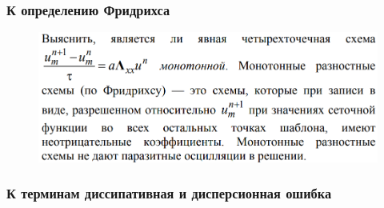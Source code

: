 \documentclass[a4paper,14pt]{article}
\begin{document}
    \subsubsection{К определению Фридрихса}
    \begin{figure}[h]
		\begin{center}
			\includegraphics[width=\textwidth]{FRH}
		\end{center}
	\end{figure}
    \vspace{0.5cm}
    \subsubsection{К терминам диссипативная и дисперсионная ошибка}
    
\end{document}
